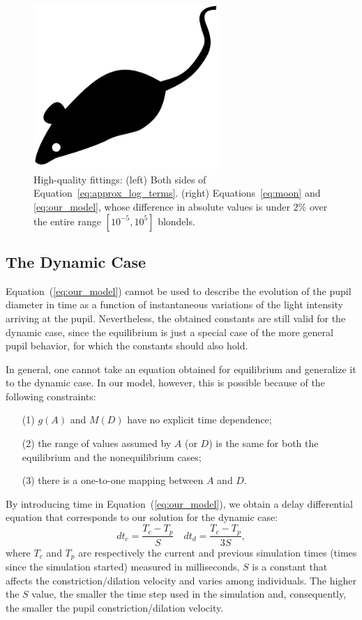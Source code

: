 \documentclass{acmtog}
\begin{document}
\begin{figure}[t]
\centerline{\includegraphics[width=7cm]{TOG-Sample-mouse}}
\caption{High-quality fittings: (left) Both sides of Equation~\ref{eq:approx_log_terms}. (right) Equations~\ref{eq:moon}
and \ref{eq:our_model}, whose difference in absolute values is under $2\%$ over the entire range $[10^{-5}, 10^{5}]$
blondels.} 
	\label{fig:Longtin_v_Moon_right_and_comparison}
\end{figure}
%
\subsection{The Dynamic Case}
\label{subsec:DynamicCase}
%
Equation~(\ref{eq:our_model}) cannot be used to describe the 
evolution of the pupil diameter in time as a function of instantaneous variations of the light intensity arriving at the pupil. Nevertheless, the obtained constants are still valid for the dynamic case, since the equilibrium is just a special case of the more general pupil behavior, for which the constants should also hold.

In general, one cannot take an equation obtained for  equilibrium and generalize it to the dynamic case. In our model, however, this is possible because of the following constraints:
\begin{enumerate}
\item[(1)] $g(A)$ and $M(D)$ have no explicit time dependence; 
\item[(2)] the range of values assumed by $A$ (or $D$) is the same for both the equilibrium and the nonequilibrium cases;
\item[(3)] there is a one-to-one mapping between $A$ and $D$.   
\end{enumerate} 

By introducing time in Equation~(\ref{eq:our_model}), we obtain a delay differential equation that 
corresponds to our solution for the dynamic case:
\begin{equation}
\label{eq:dTEval}
  {{dt}}_{c} = \frac{T_{c} - T_{p}}{S} \quad
  {{dt}}_{d} = \frac{T_{c} - T_{p}}{3S},
\end{equation}  
where $T_{c}$ and $T_{p}$ are respectively the current and previous simulation times (times since the simulation started) measured in milliseconds, $S$ is a constant that affects the constriction/dilation velocity and varies among individuals. The higher the $S$ value, the smaller the time step used in the simulation and, consequently, the smaller the pupil constriction/dilation  velocity.
\end{document}
